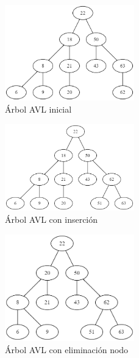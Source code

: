 \documentclass{article}
\begin{document}
            \begin{figure}[htbp]
              \centering
              \includegraphics[width=0.5\textwidth]{img/avltree.png}
              \caption{Árbol AVL inicial}
              \label{fig:avlInicial}
            \end{figure}
            \begin{figure}[htbp]
              \centering
              \includegraphics[width=0.5\textwidth]{img/avltree-insertion.png}
              \caption{Árbol AVL con inserción }
                \label{fig:avlIsertion}
            \end{figure}
            \begin{figure}[htbp]
              \centering
              \includegraphics[width=0.5\textwidth]{img/avltree-deletion.png}
              \caption{Árbol AVL con eliminación nodo}
            \label{fig:avldelete}
            \end{figure}
\end{document}
